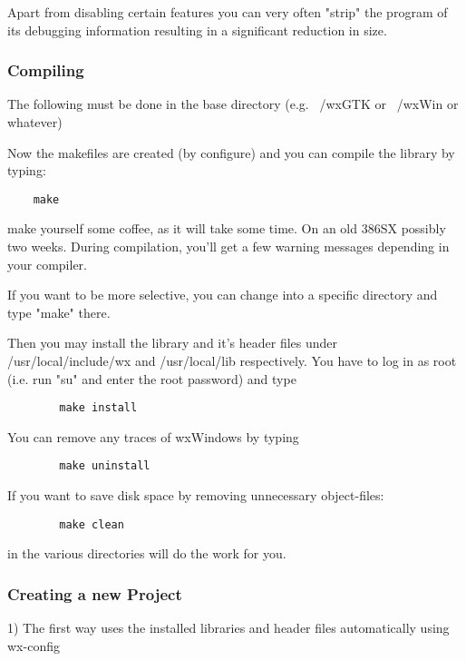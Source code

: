 Apart from disabling certain features you can very often "strip"
the program of its debugging information resulting in a significant
reduction in size.

\subsubsection{Compiling}

The following must be done in the base directory (e.g. ~/wxGTK
or ~/wxWin or whatever)

Now the makefiles are created (by configure) and you can compile 
the library by typing:

\begin{verbatim}
	make
\end{verbatim}

make yourself some coffee, as it will take some time. On an old
386SX possibly two weeks. During compilation, you'll get a few 
warning messages depending in your compiler.

If you want to be more selective, you can change into a specific
directory and type "make" there.

Then you may install the library and it's header files under
/usr/local/include/wx and /usr/local/lib respectively. You
have to log in as root (i.e. run "su" and enter the root
password) and type

\begin{verbatim}
        make install	
\end{verbatim}

You can remove any traces of wxWindows by typing

\begin{verbatim}
        make uninstall
\end{verbatim}
	
If you want to save disk space by removing unnecessary
object-files:

\begin{verbatim}
	    make clean
\end{verbatim}

in the various directories will do the work for you.

\subsubsection{Creating a new Project}

1) The first way uses the installed libraries and header files
automatically using wx-config

